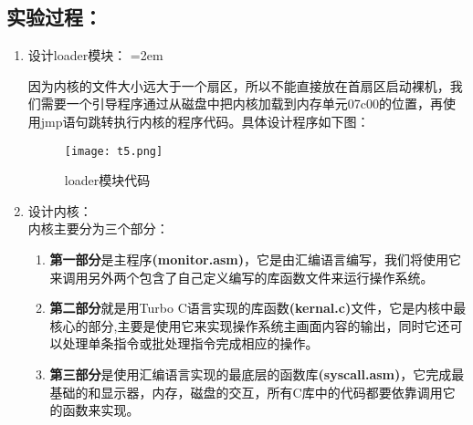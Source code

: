 \documentclass[UTF8]{article}
\begin{document}
\subsection{实验过程：}
\begin{enumerate}[1)]
\heiti\setlength{\itemsep}{0em}
	\item 设计loader模块：
	\parindent=2em %
	\par\indent 
	因为内核的文件大小远大于一个扇区，所以不能直接放在首扇区启动裸机，我们需要一个引导程序通过从磁盘中把内核加载到内存单元07c00的位置，再使用jmp语句跳转执行内核的程序代码。具体设计程序如下图：
			\begin{figure}[htbp]
				\centering
				\texttt{[image: t5.png]}
				\caption{loader模块代码}
  			\end{figure}
	\item 设计内核：
	\\ 内核主要分为三个部分：
	\vspace{-0.2cm}
	\begin{enumerate}[-]
	\item {\bfseries 第一部分}是主程序{\color{red}\bfseries (monitor.asm)}，它是由汇编语言编写，我们将使用它来调用另外两个包含了自己定义编写的库函数文件来运行操作系统。
	\item {\bfseries 第二部分}就是用Turbo C语言实现的库函数{\color{red}\bfseries (kernal.c)}文件，它是内核中最核心的部分,主要是使用它来实现操作系统主画面内容的输出，同时它还可以处理单条指令或批处理指令完成相应的操作。
	\item {\bfseries 第三部分}是使用汇编语言实现的最底层的函数库{\color{red}\bfseries (syscall.asm)}，它完成最基础的和显示器，内存，磁盘的交互，所有C库中的代码都要依靠调用它的函数来实现。
	\end{enumerate}

	{\bfseries \quad {}}
	

\end{enumerate}
\end{document}
